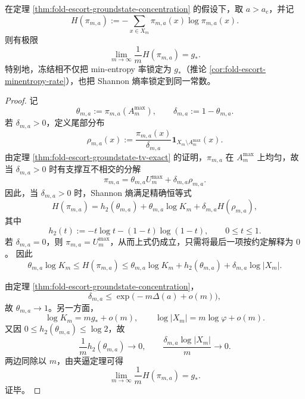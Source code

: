 \begin{theorem}\label{thm:fold-escort-groundstate-shannon-rate-lock}
在定理 \ref{thm:fold-escort-groundstate-concentration} 的假设下，取 \(a>a_{\mathrm c}\)，并记
\[
H(\pi_{m,a}):=-\sum_{x\in X_m}\pi_{m,a}(x)\log \pi_{m,a}(x).
\]
则有极限
\[
\boxed{\;
\lim_{m\to\infty}\frac1mH(\pi_{m,a})=g_*.\;}
\]
特别地，冻结相不仅把 min-entropy 率锁定为 \(g_*\)（推论 \ref{cor:fold-escort-minentropy-rate}），也把 Shannon 熵率锁定到同一常数。
\end{theorem}
\begin{proof}
记
\[
\theta_{m,a}:=\pi_{m,a}(A_m^{\max}),
\qquad
\delta_{m,a}:=1-\theta_{m,a}.
\]
若 \(\delta_{m,a}>0\)，定义尾部分布
\[
\rho_{m,a}(x):=\frac{\pi_{m,a}(x)}{\delta_{m,a}}\mathbf 1_{X_m\setminus A_m^{\max}}(x).
\]
由定理 \ref{thm:fold-escort-groundstate-tv-exact} 的证明，\(\pi_{m,a}\) 在 \(A_m^{\max}\) 上均匀，故当 \(\delta_{m,a}>0\) 时有支撑互不相交的分解
\[
\pi_{m,a}=\theta_{m,a}U_m^{\max}+\delta_{m,a}\rho_{m,a}.
\]
因此，当 \(\delta_{m,a}>0\) 时，Shannon 熵满足精确恒等式
\[
H(\pi_{m,a})
=
h_2(\theta_{m,a})+\theta_{m,a}\log K_m+\delta_{m,a}H(\rho_{m,a}),
\]
其中
\[
h_2(t):=-t\log t-(1-t)\log(1-t),
\qquad 0\le t\le 1.
\]
若 \(\delta_{m,a}=0\)，则 \(\pi_{m,a}=U_m^{\max}\)，从而上式仍成立，只需将最后一项按约定解释为 \(0\)。
因此
\[
\theta_{m,a}\log K_m
\le
H(\pi_{m,a})
\le
\theta_{m,a}\log K_m+h_2(\theta_{m,a})+\delta_{m,a}\log|X_m|.
\]

由定理 \ref{thm:fold-escort-groundstate-concentration}，
\[
\delta_{m,a}\le \exp\!\bigl(-m\Delta(a)+o(m)\bigr),
\]
故 \(\theta_{m,a}\to 1\)。另一方面，
\[
\log K_m=mg_*+o(m),
\qquad
\log|X_m|=m\log\varphi+o(m).
\]
又因 \(0\le h_2(\theta_{m,a})\le \log 2\)，故
\[
\frac{1}{m}h_2(\theta_{m,a})\to 0,
\qquad
\frac{\delta_{m,a}\log|X_m|}{m}\to 0.
\]
两边同除以 \(m\)，由夹逼定理可得
\[
\lim_{m\to\infty}\frac1mH(\pi_{m,a})=g_*.
\]
证毕。
\end{proof}

